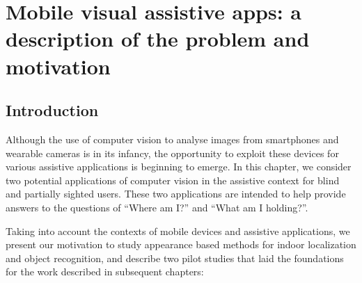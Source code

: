 \chapter{Mobile visual assistive apps: a description of the problem and motivation}\label{ch:chapter2} %


%
%
%
%

\section{Introduction}

Although the use of computer vision to analyse images from smartphones and wearable cameras is in its infancy, the opportunity to exploit these devices for various assistive applications is beginning to emerge. In this chapter, we consider two potential applications of computer vision in the assistive context for blind and partially sighted users. These two applications are intended to help provide answers to the questions of ``Where am I?'' and ``What am I holding?''.

Taking into account the contexts of mobile devices and assistive applications, we present our motivation to study appearance based methods for indoor localization and object recognition, and describe two pilot studies that laid the foundations for the work described in subsequent chapters:


